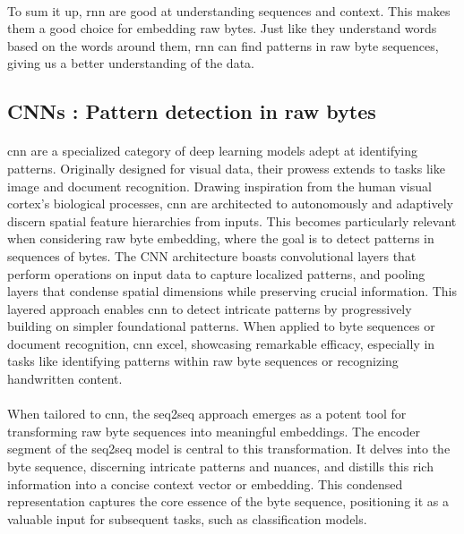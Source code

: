         \paragraph{}To sum it up, \acrshort{rnn} are good at understanding sequences and context. This makes them a good choice for embedding raw bytes. Just like they understand words based on the words around them, \acrshort{rnn} can find patterns in raw byte sequences, giving us a better understanding of the data.
    \subsection{CNNs : Pattern detection in raw bytes}
        \paragraph{}\acrfull{cnn}\cite{lecun_gradient-based_1998} are a specialized category of deep learning models adept at identifying patterns. Originally designed for visual data, their prowess extends to tasks like image and document recognition. Drawing inspiration from the human visual cortex's biological processes, \acrshort{cnn} are architected to autonomously and adaptively discern spatial feature hierarchies from inputs. This becomes particularly relevant when considering raw byte embedding, where the goal is to detect patterns in sequences of bytes. The CNN architecture boasts convolutional layers that perform operations on input data to capture localized patterns, and pooling layers that condense spatial dimensions while preserving crucial information. This layered approach enables \acrshort{cnn} to detect intricate patterns by progressively building on simpler foundational patterns. When applied to byte sequences or document recognition, \acrshort{cnn} excel, showcasing remarkable efficacy, especially in tasks like identifying patterns within raw byte sequences or recognizing handwritten content.

        \paragraph{}When tailored to \acrshort{cnn}, the \acrfull{seq2seq}\cite{gehring_convolutional_2017} approach emerges as a potent tool for transforming raw byte sequences into meaningful embeddings. The encoder segment of the \acrshort{seq2seq} model is central to this transformation. It delves into the byte sequence, discerning intricate patterns and nuances, and distills this rich information into a concise context vector or embedding. This condensed representation captures the core essence of the byte sequence, positioning it as a valuable input for subsequent tasks, such as classification models.

